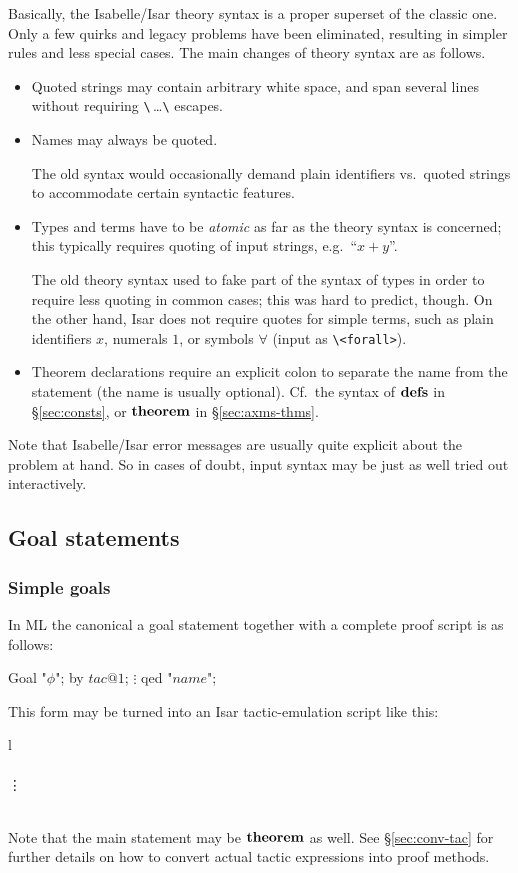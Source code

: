 Basically, the Isabelle/Isar theory syntax is a proper superset of the classic
one.  Only a few quirks and legacy problems have been eliminated, resulting in
simpler rules and less special cases.  The main changes of theory syntax are
as follows.

\begin{itemize}
\item Quoted strings may contain arbitrary white space, and span several lines
  without requiring \verb,\,\,\dots\verb,\, escapes.
\item Names may always be quoted.
  
  The old syntax would occasionally demand plain identifiers vs.\ quoted
  strings to accommodate certain syntactic features.
\item Types and terms have to be \emph{atomic} as far as the theory syntax is
  concerned; this typically requires quoting of input strings, e.g.\ ``$x +
  y$''.
  
  The old theory syntax used to fake part of the syntax of types in order to
  require less quoting in common cases; this was hard to predict, though.  On
  the other hand, Isar does not require quotes for simple terms, such as plain
  identifiers $x$, numerals $1$, or symbols $\forall$ (input as
  \verb,\<forall>,).
\item Theorem declarations require an explicit colon to separate the name from
  the statement (the name is usually optional).  Cf.\ the syntax of ${\mathord{\mathbf{defs}}}$ in
  \S\ref{sec:consts}, or ${\mathord{\mathbf{theorem}}}$ in \S\ref{sec:axms-thms}.
\end{itemize}

Note that Isabelle/Isar error messages are usually quite explicit about the
problem at hand.  So in cases of doubt, input syntax may be just as well tried
out interactively.


\subsection{Goal statements}\label{sec:conv-goal}

\subsubsection{Simple goals}

In ML the canonical a goal statement together with a complete proof script is
as follows:
\begin{ttbox}
 Goal "\(\phi\)";
 by \(tac@1\);
   \(\vdots\)
 qed "\(name\)";
\end{ttbox}
This form may be turned into an Isar tactic-emulation script like this:
\begin{matharray}{l}
   \\
  \quad {} \\
  \qquad \vdots \\
  \quad \DONE \\
\end{matharray}
Note that the main statement may be ${\mathord{\mathbf{theorem}}}$ as well.  See
\S\ref{sec:conv-tac} for further details on how to convert actual tactic
expressions into proof methods.

